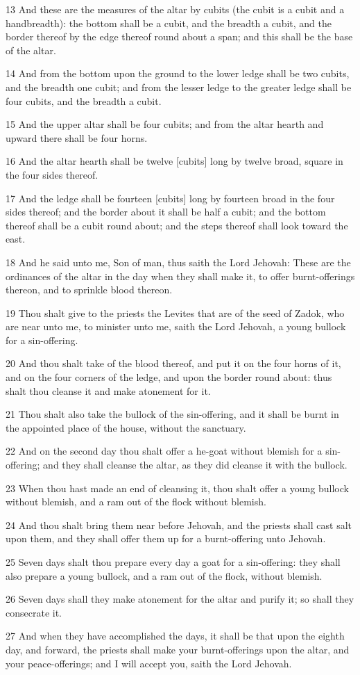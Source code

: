 \par 13 And these are the measures of the altar by cubits (the cubit is a cubit and a handbreadth): the bottom shall be a cubit, and the breadth a cubit, and the border thereof by the edge thereof round about a span; and this shall be the base of the altar.
\par 14 And from the bottom upon the ground to the lower ledge shall be two cubits, and the breadth one cubit; and from the lesser ledge to the greater ledge shall be four cubits, and the breadth a cubit.
\par 15 And the upper altar shall be four cubits; and from the altar hearth and upward there shall be four horns.
\par 16 And the altar hearth shall be twelve [cubits] long by twelve broad, square in the four sides thereof.
\par 17 And the ledge shall be fourteen [cubits] long by fourteen broad in the four sides thereof; and the border about it shall be half a cubit; and the bottom thereof shall be a cubit round about; and the steps thereof shall look toward the east.
\par 18 And he said unto me, Son of man, thus saith the Lord Jehovah: These are the ordinances of the altar in the day when they shall make it, to offer burnt-offerings thereon, and to sprinkle blood thereon.
\par 19 Thou shalt give to the priests the Levites that are of the seed of Zadok, who are near unto me, to minister unto me, saith the Lord Jehovah, a young bullock for a sin-offering.
\par 20 And thou shalt take of the blood thereof, and put it on the four horns of it, and on the four corners of the ledge, and upon the border round about: thus shalt thou cleanse it and make atonement for it.
\par 21 Thou shalt also take the bullock of the sin-offering, and it shall be burnt in the appointed place of the house, without the sanctuary.
\par 22 And on the second day thou shalt offer a he-goat without blemish for a sin-offering; and they shall cleanse the altar, as they did cleanse it with the bullock.
\par 23 When thou hast made an end of cleansing it, thou shalt offer a young bullock without blemish, and a ram out of the flock without blemish.
\par 24 And thou shalt bring them near before Jehovah, and the priests shall cast salt upon them, and they shall offer them up for a burnt-offering unto Jehovah.
\par 25 Seven days shalt thou prepare every day a goat for a sin-offering: they shall also prepare a young bullock, and a ram out of the flock, without blemish.
\par 26 Seven days shall they make atonement for the altar and purify it; so shall they consecrate it.
\par 27 And when they have accomplished the days, it shall be that upon the eighth day, and forward, the priests shall make your burnt-offerings upon the altar, and your peace-offerings; and I will accept you, saith the Lord Jehovah.

